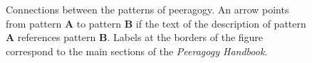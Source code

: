 \newpage

\afterpage{\clearpage}
\begin{figure}[p]
\vspace{-.9in}
{\centering


\par
}
\vspace{-.9in}
\caption{Connections between the patterns of peeragogy.  An arrow points from pattern \textbf{A} to pattern \textbf{B} if the text of the description of pattern \textbf{A} references pattern \textbf{B}.  Labels at the borders of the figure correspond to the main sections of the \emph{Peeragogy Handbook}.\label{fig:connections}}
\end{figure}
\FloatBarrier

\newpage

%  

  
